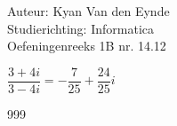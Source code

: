 \documentclass[a4paper]{article}
\begin{document}
  
\noindent \large Auteur: Kyan Van den Eynde \\
\noindent \large Studierichting: Informatica\\
\noindent \large Oefeningenreeks 1B nr. 14.12\\

\medskip

\normalsize

$\dfrac{3+4i}{3-4i} = -\dfrac{7}{25} + \dfrac{24}{25}i$\\

\begin{thebibliography}{999}
\end{thebibliography}
\end{document}
